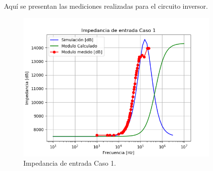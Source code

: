 Aquí se presentan las mediciones realizadas para el circuito inversor.

\begin{figure}[H]	
	\centering
	\includegraphics[width=0.9\textwidth]{Ejercicio1/Imagenes/ZinC1.png}
	\caption{Impedancia de entrada Caso 1.}
	\label{fig:CompZinC1}
\end{figure} 

